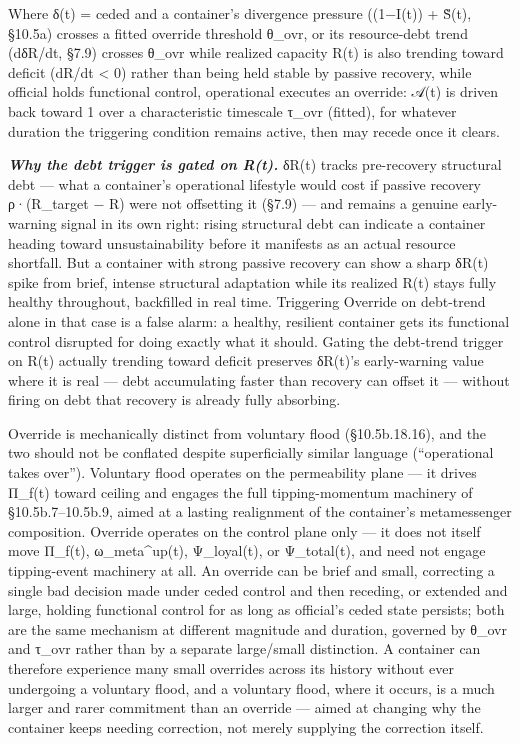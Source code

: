 \documentclass[
]{article}
\begin{document}
Where δ(t) = ceded and a container's divergence pressure ((1−I(t)) +
S̃(t), §10.5a) crosses a fitted override threshold θ\_ovr, or its
resource-debt trend (dδR/dt, §7.9) crosses θ\_ovr while realized
capacity R(t) is also trending toward deficit (dR/dt \textless{} 0)
rather than being held stable by passive recovery, while official holds
functional control, operational executes an override: 𝒜(t) is driven
back toward 1 over a characteristic timescale τ\_ovr (fitted), for
whatever duration the triggering condition remains active, then may
recede once it clears.

\emph{\textbf{Why the debt trigger is gated on R(t).}} δR(t) tracks
pre-recovery structural debt --- what a container's operational
lifestyle would cost if passive recovery ρ·(R\_target − R) were not
offsetting it (§7.9) --- and remains a genuine early-warning signal in
its own right: rising structural debt can indicate a container heading
toward unsustainability before it manifests as an actual resource
shortfall. But a container with strong passive recovery can show a sharp
δR(t) spike from brief, intense structural adaptation while its realized
R(t) stays fully healthy throughout, backfilled in real time. Triggering
Override on debt-trend alone in that case is a false alarm: a healthy,
resilient container gets its functional control disrupted for doing
exactly what it should. Gating the debt-trend trigger on R(t) actually
trending toward deficit preserves δR(t)'s early-warning value where it
is real --- debt accumulating faster than recovery can offset it ---
without firing on debt that recovery is already fully absorbing.

Override is mechanically distinct from voluntary flood (§10.5b.18.16),
and the two should not be conflated despite superficially similar
language (``operational takes over''). Voluntary flood operates on the
permeability plane --- it drives Π\_f(t) toward ceiling and engages the
full tipping-momentum machinery of §10.5b.7--10.5b.9, aimed at a lasting
realignment of the container's metamessenger composition. Override
operates on the control plane only --- it does not itself move Π\_f(t),
ω\_meta\^{}up(t), Ψ\_loyal(t), or Ψ\_total(t), and need not engage
tipping-event machinery at all. An override can be brief and small,
correcting a single bad decision made under ceded control and then
receding, or extended and large, holding functional control for as long
as official's ceded state persists; both are the same mechanism at
different magnitude and duration, governed by θ\_ovr and τ\_ovr rather
than by a separate large/small distinction. A container can therefore
experience many small overrides across its history without ever
undergoing a voluntary flood, and a voluntary flood, where it occurs, is
a much larger and rarer commitment than an override --- aimed at
changing why the container keeps needing correction, not merely
supplying the correction itself.
\end{document}
